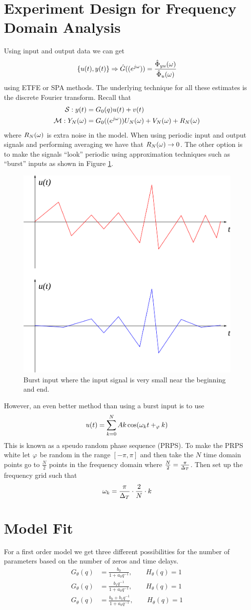 \section{Experiment Design for Frequency Domain Analysis}
Using input and output data we can get
$$\{u(t),y(t)\} \Rightarrow \hat{G}((e^{j\omega})) = \frac{\hat{\Phi}_{yu}(\omega)}{\hat{\Phi}_u(\omega)}$$
using ETFE or SPA methods. The underlying technique for all these estimates is the discrete Fourier transform. Recall that
\begin{align*}
\mathcal{S}: y(t) &= G_0(q)u(t) + v(t) \\
\mathcal{M}: Y_N(\omega) &= G_0((e^{j\omega}))U_N(\omega) + V_N(\omega) + R_N(\omega)
\end{align*}
where $R_N(\omega)$ is extra noise in the model. When using periodic input and output signals and performing averaging we have that $R_N(\omega)\to0$. The other option is to make the signals ``look'' periodic using approximation techniques such as ``burst'' inputs as shown in Figure \ref{fig:19burst}.

\begin{figure}[ht!]
	\centering
	\includegraphics[width=.4\textwidth]{images/19burst}
	\caption{Burst input where the input signal is very small near the beginning and end.}
	\label{fig:19burst}
\end{figure}

However, an even better method than using a burst input is to use
$$u(t) = \sum_{k=0}^N Ak\cos(\omega_kt+_\varphi k)$$
This is known as a speudo random phase sequence (PRPS). To make the PRPS white let $\varphi$ be random in the range $[-\pi,\pi]$ and then take the $N$ time domain points go to $\frac{N}{2}$ points in the frequency domain where $\frac{N}{2}=\frac{\pi}{\Delta_T}$. Then set up the frequency grid such that
$$\omega_k = \frac{\pi}{\Delta_T}\cdot\frac{2}{N}\cdot k$$

\section{Model Fit}
For a first order model we get three different possibilities for the number of parameters based on the number of zeros and time delays.
\begin{align*}
G_\theta(q) &= \frac{b_0}{1+a_0q^{-1}}, \qquad H_\theta(q) = 1 \\
G_\theta(q) &= \frac{b_1q^{-1}}{1+a_0q^{-1}}, \qquad H_\theta(q) = 1 \\
G_\theta(q) &= \frac{b_0+b_1q^{-1}}{1+a_0q^{-1}}, \qquad H_\theta(q) = 1
\end{align*}

